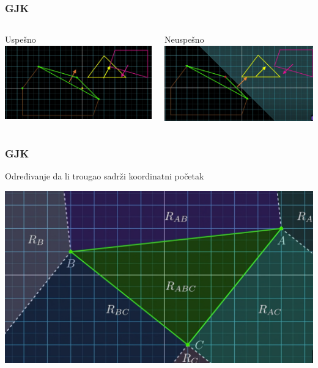 \documentclass{beamer}
\begin{document}
\begin{frame}
	\frametitle{GJK}
	\begin{columns}
		\begin{center}
			\Large
			Uspešno
			\includegraphics[scale=0.141]{./images/gjk6.png}
		\end{center}
		\begin{center}
			\Large
			Neuspešno
			\includegraphics[scale=0.14]{./images/gjk7.png}
		\end{center}
	\end{columns}
\end{frame}

\begin{frame}
	\frametitle{GJK}
	\Large
	Određivanje da li trougao sadrži koordinatni početak
	\begin{center}
		\includegraphics[scale=0.26]{./images/gjk8.png}
	\end{center}
\end{frame}
\end{document}
